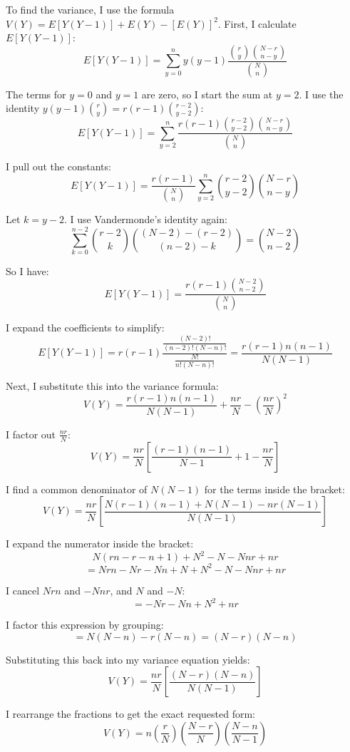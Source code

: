 \documentclass{article}
\begin{document}
To find the variance, I use the formula $V(Y) = E[Y(Y-1)] + E(Y) - [E(Y)]^2$. First, I calculate $E[Y(Y-1)]$:
\[ E[Y(Y-1)] = \sum_{y=0}^{n} y(y-1) \frac{\binom{r}{y}\binom{N-r}{n-y}}{\binom{N}{n}} \]

The terms for $y=0$ and $y=1$ are zero, so I start the sum at $y=2$. I use the identity $y(y-1)\binom{r}{y} = r(r-1)\binom{r-2}{y-2}$:
\[ E[Y(Y-1)] = \sum_{y=2}^{n} \frac{r(r-1)\binom{r-2}{y-2}\binom{N-r}{n-y}}{\binom{N}{n}} \]

I pull out the constants:
\[ E[Y(Y-1)] = \frac{r(r-1)}{\binom{N}{n}} \sum_{y=2}^{n} \binom{r-2}{y-2}\binom{N-r}{n-y} \]

Let $k = y - 2$. I use Vandermonde's identity again:
\[ \sum_{k=0}^{n-2} \binom{r-2}{k}\binom{(N-2)-(r-2)}{(n-2)-k} = \binom{N-2}{n-2} \]

So I have:
\[ E[Y(Y-1)] = \frac{r(r-1)\binom{N-2}{n-2}}{\binom{N}{n}} \]

I expand the coefficients to simplify:
\[ E[Y(Y-1)] = r(r-1) \frac{\frac{(N-2)!}{(n-2)!(N-n)!}}{\frac{N!}{n!(N-n)!}} = \frac{r(r-1)n(n-1)}{N(N-1)} \]

Next, I substitute this into the variance formula:
\[ V(Y) = \frac{r(r-1)n(n-1)}{N(N-1)} + \frac{nr}{N} - \left(\frac{nr}{N}\right)^2 \]

I factor out $\frac{nr}{N}$:
\[ V(Y) = \frac{nr}{N} \left[ \frac{(r-1)(n-1)}{N-1} + 1 - \frac{nr}{N} \right] \]

I find a common denominator of $N(N-1)$ for the terms inside the bracket:
\[ V(Y) = \frac{nr}{N} \left[ \frac{N(r-1)(n-1) + N(N-1) - nr(N-1)}{N(N-1)} \right] \]

I expand the numerator inside the bracket:
\[ N(rn - r - n + 1) + N^2 - N - Nnr + nr \]
\[ = Nrn - Nr - Nn + N + N^2 - N - Nnr + nr \]

I cancel $Nrn$ and $-Nnr$, and $N$ and $-N$:
\[ = -Nr - Nn + N^2 + nr \]

I factor this expression by grouping:
\[ = N(N-n) - r(N-n) = (N-r)(N-n) \]

Substituting this back into my variance equation yields:
\[ V(Y) = \frac{nr}{N} \left[ \frac{(N-r)(N-n)}{N(N-1)} \right] \]

I rearrange the fractions to get the exact requested form:
\[ V(Y) = n \left(\frac{r}{N}\right) \left(\frac{N-r}{N}\right) \left(\frac{N-n}{N-1}\right) \]
\end{document}
